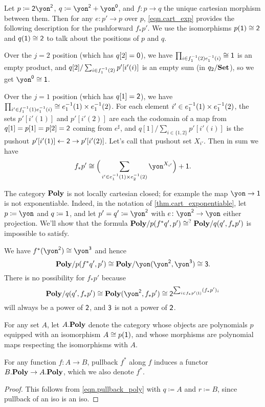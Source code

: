 \documentclass[DynamicalBook]{subfiles}
\begin{document}
\begin{example}
Let $p\coloneqq\2\yon^\2$, $q\coloneqq\yon^\2+\yon^\0$, and $f\colon p\to q$ the unique cartesian morphism between them. Then for any $e\colon p'\to p$ over $p$, \eqref{eqn.cart_exp} provides the following description for the pushforward $f_*p'$. We use the isomorphisms $p(\1)\cong\2$ and $q(\1)\cong\2$ to talk about the positions of $p$ and $q$.

Over the $j=2$ position (which has $q[2]=\0$), we have $\prod_{i\in f_1\inv(2)e_1\inv(i)}\cong\1$ is an empty product, and $q[2]/\sum_{i\in f_1\inv(2)}p'[i'(i)]$ is an empty sum (in $q_2/\smset$), so we get $\yon^\0\cong\1$.

Over the $j=1$ position (which has $q[1]=\2$), we have $\prod_{i'\in f_1\inv(1)e_1\inv(i)}\cong e_1\inv(1)\times e_1\inv(2)$. For each element $i'\in e_1\inv(1)\times e_1\inv(2)$, the sets $p'[i'(1)]$ and $p'[i'(2)]$ are each the codomain of a map from $q[1]=p[1]=p[2]=\2$ coming from $e^\sharp$, and $q[1]/\sum_{i\in\{1,2\}}p'[i'(i)]$ is the pushout $p'[i'(1)]\from\2\to p'[i'(2)]$. Let's call that pushout set $X_{i'}$. Then in sum we have
\[
f_*p'\cong\Big(\sum_{i'\in e_1\inv(1)\times e_2\inv(2)}\yon^{X_{i'}}\Big)+\1.
\]
\end{example}

\begin{remark}
The category $\poly$ is not locally cartesian closed; for example the map $\yon\to\1$ is not exponentiable. Indeed, in the notation of \cref{thm.cart_exponentiable}, let $p\coloneqq\yon$ and $q\coloneqq\1$, and let $p'=q'\coloneqq\yon^\2$ with $e\colon\yon^\2\to\yon$ either projection. We'll show that the formula $\poly/p(f^*q',p')\cong^?\poly/q(q',f_*p')$ is impossible to satisfy.

We have $f^*(\yon^\2)\cong\yon^\3$ and hence
\[\poly/p(f^*q',p')\cong\poly/\yon(\yon^\2,\yon^\3)\cong\3.\]
There is no possibility for $f_*p'$ because
\[
\poly/q(q',f_*p')\cong\poly(\yon^\2,f_*p')\cong\2^{\sum_{i\in f_*p'(\1)}(f_*p')_i}
\]
will always be a power of $\2$, and $\3$ is not a power of $\2$.
\end{remark}

For any set $A$, let $\poly[A.]$ denote the category whose objects are polynomials $p$ equipped with an isomorphism $A\cong p(\1)$, and whose morphisms are polynomial maps respecting the isomorphisms with $A$.

\begin{proposition}
For any function $f\colon A\to B$, pullback $f^*$ along $f$ induces a functor $\poly[B.]\to\poly[A.]$, which we also denote $f^*$.
\end{proposition}
\begin{proof}
This follows from \eqref{eqn.pullback_poly} with $q\coloneqq A$ and $r\coloneqq B$, since pullback of an iso is an iso.
\end{proof}
\end{document}
